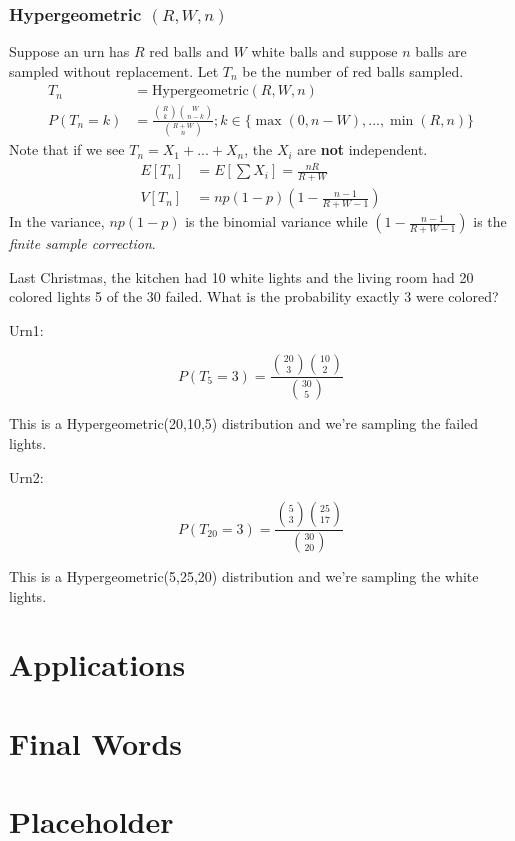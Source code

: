 \documentclass[]{book}
\let\BeginKnitrBlock\begin \let\EndKnitrBlock\end
\begin{document}
\subsection{\texorpdfstring{Hypergeometric
\((R,W,n)\)}{Hypergeometric (R,W,n)}}\label{hypergeometric-rwn}

Suppose an urn has \(R\) red balls and \(W\) white balls and suppose
\(n\) balls are sampled without replacement. Let \(T_n\) be the number
of red balls sampled. \[
\begin{aligned}
  T_n &= \mbox{Hypergeometric}(R,W,n) \\
  P(T_n = k) &= \frac{{R \choose k}{W \choose n-k}}{{R + W \choose n}}; k \in \{ \max(0, n-W), ..., \min(R,n)\}
\end{aligned}
\] Note that if we see \(T_n = X_1 + ... + X_n\), the \(X_i\) are
\textbf{not} independent. \[
\begin{aligned}
  E[T_n] &= E[\sum X_i] = \frac{nR}{R+W} \\
  V[T_n] &= np(1-p)\left(1 - \frac{n-1}{R+W-1}\right)
\end{aligned}
\] In the variance, \(np(1-p)\) is the binomial variance while
\(\left(1 - \frac{n-1}{R+W-1}\right)\) is the \emph{finite sample
correction}.

\BeginKnitrBlock{rmdexample}
Last Christmas, the kitchen had 10 white lights and the living room had
20 colored lights 5 of the 30 failed. What is the probability exactly 3
were colored?
\EndKnitrBlock{rmdexample}

Urn1:

\[P(T_5 = 3) = \frac{{20 \choose 3} {10 \choose 2}}{{30 \choose 5}} \]

This is a Hypergeometric(20,10,5) distribution and we're sampling the
failed lights.

Urn2:

\[ P(T_{20} = 3) = \frac{{5 \choose 3} {25 \choose 17}}{{30 \choose 20}}\]

This is a Hypergeometric(5,25,20) distribution and we're sampling the
white lights.

\chapter{Applications}\label{applications}

\chapter{Final Words}\label{final-words}

\chapter{Placeholder}\label{placeholder}


\end{document}
